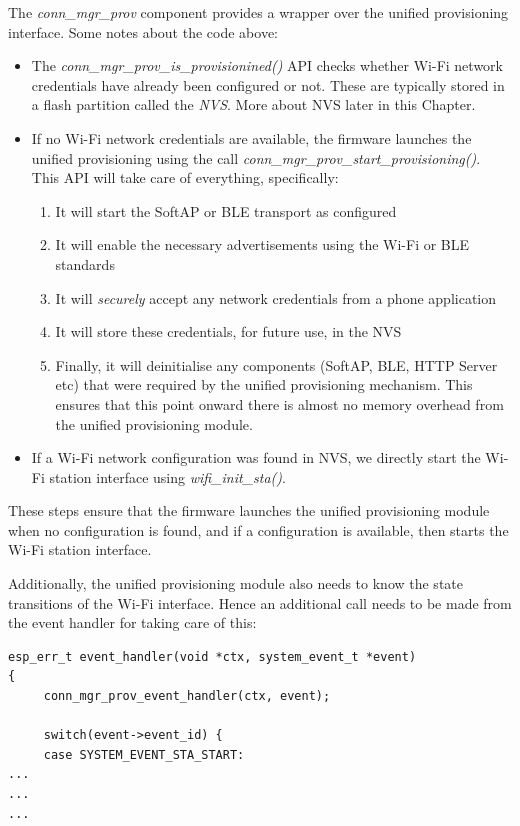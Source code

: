 \documentclass[11pt,fleqn]{book} %
\begin{document}
The \textit{conn\_mgr\_prov} component provides a wrapper over the unified provisioning interface. Some notes about the code above:
\begin{itemize}
    \item The \textit{conn\_mgr\_prov\_is\_provisionined()} API checks whether Wi-Fi network credentials have already been configured or not. These are typically stored in a flash partition called the \textit{NVS}. More about NVS later in this Chapter.
    \item If no Wi-Fi network credentials are available, the firmware launches the unified provisioning using the call \textit{conn\_mgr\_prov\_start\_provisioning()}. This API will take care of everything, specifically:
    \begin{enumerate}
        \item It will start the SoftAP or BLE transport as configured
        \item It will enable the necessary advertisements using the Wi-Fi or BLE standards
        \item It will \textit{securely} accept any network credentials from a phone application
        \item It will store these credentials, for future use, in the NVS
        \item Finally, it will deinitialise any components (SoftAP, BLE, HTTP Server etc) that were required by the unified provisioning mechanism. This ensures that this point onward there is almost no memory overhead from the unified provisioning module.
    \end{enumerate}
    \item If a Wi-Fi network configuration was found in NVS, we directly start the Wi-Fi station interface using \textit{wifi\_init\_sta()}.
\end{itemize}

These steps ensure that the firmware launches the unified provisioning module when no configuration is found, and if a configuration is available, then starts the Wi-Fi station interface.

Additionally, the unified provisioning module also needs to know the state transitions of the Wi-Fi interface. Hence an additional call needs to be made from the event handler for taking care of this:
\begin{verbatim}
esp_err_t event_handler(void *ctx, system_event_t *event)
{
     conn_mgr_prov_event_handler(ctx, event);
   
     switch(event->event_id) {
     case SYSTEM_EVENT_STA_START:
...
...
...
\end{verbatim}
\end{document}
